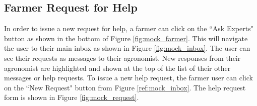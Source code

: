 \subsection{Farmer Request for Help}
\begin{flushleft}
In order to issue a new request for help, a farmer can click on the “Ask Experts" button as shown in the bottom of Figure \ref{fig:mock_farmer}. This will navigate the user to their main inbox as shown in Figure \ref{fig:mock_inbox}. The user can see their requests as messages to their agronomist. New responses from their agronomist are highlighted and shown at the top of the list of their other messages or help requests. To issue a new help request, the farmer user can click on the “New Request" button from Figure \ref{ref:mock_inbox}. The help request form is shown in Figure \ref{fig:mock_request}.
\end{flushleft}

